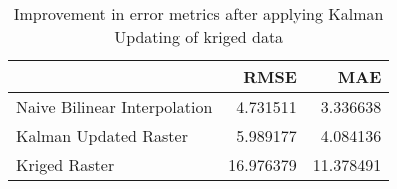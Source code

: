 \begin{table}
\caption{Improvement in error metrics after applying Kalman Updating of kriged data}
\label{tab:oahu8_gebco_raster_error}
\begin{tabular}{lrr}
\toprule
 & RMSE & MAE \\
\midrule
Naive Bilinear Interpolation & 4.731511 & 3.336638 \\
Kalman Updated Raster & 5.989177 & 4.084136 \\
Kriged Raster & 16.976379 & 11.378491 \\
\bottomrule
\end{tabular}
\end{table}

